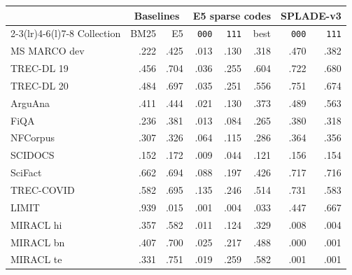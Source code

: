 \begin{tabular}{@{}lrrrrrrr@{}}
\toprule
 & \multicolumn{2}{c}{Baselines} & \multicolumn{3}{c}{E5 sparse codes} & \multicolumn{2}{c}{SPLADE-v3} \\
\cmidrule(lr){2-3}\cmidrule(lr){4-6}\cmidrule(l){7-8}
Collection & BM25 & E5 & \texttt{000} & \texttt{111} & best & \texttt{000} & \texttt{111} \\
\midrule
MS MARCO dev & .222 & .425 & .013 & .130 & .318 & .470 & .382 \\
TREC-DL 19 & .456 & .704 & .036 & .255 & .604 & .722 & .680 \\
TREC-DL 20 & .484 & .697 & .035 & .251 & .556 & .751 & .674 \\
ArguAna & .411 & .444 & .021 & .130 & .373 & .489 & .563 \\
FiQA & .236 & .381 & .013 & .084 & .265 & .380 & .318 \\
NFCorpus & .307 & .326 & .064 & .115 & .286 & .364 & .356 \\
SCIDOCS & .152 & .172 & .009 & .044 & .121 & .156 & .154 \\
SciFact & .662 & .694 & .088 & .197 & .426 & .717 & .716 \\
TREC-COVID & .582 & .695 & .135 & .246 & .514 & .731 & .583 \\
LIMIT & .939 & .015 & .001 & .004 & .033 & .447 & .667 \\
MIRACL hi & .357 & .582 & .011 & .124 & .329 & .008 & .004 \\
MIRACL bn & .407 & .700 & .025 & .217 & .488 & .000 & .001 \\
MIRACL te & .331 & .751 & .019 & .259 & .582 & .001 & .001 \\
\bottomrule
\end{tabular}
